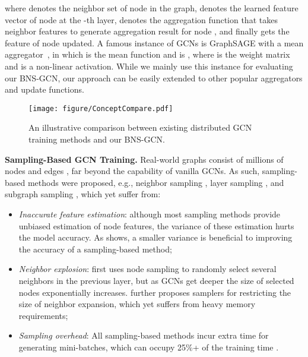 \documentclass{article}
\newcommand{\niparagraph}[1]{\noindent\textbf{#1}}
\begin{document}
where  denotes the neighbor set of node  in the graph,  denotes the learned feature vector of node  at the -th layer, 
 denotes the aggregation function that takes neighbor features to generate aggregation result  for node , and finally  gets the feature of node  updated. 
A famous instance of GCNs is GraphSAGE with a mean aggregator~\citep{hamilton2017inductive}, in which  is the mean function and  is , where  is the weight matrix and  is a non-linear activation. While we mainly use this instance for evaluating our BNS-GCN, our approach can be easily extended to other popular aggregators and update functions.
\begin{figure*}[!t]
    \begin{center}
    \texttt{[image: figure/ConceptCompare.pdf]}
    \end{center}
    \caption{An illustrative comparison between existing distributed GCN training methods and our BNS-GCN.}
    \label{fig:ConceptCompare}
\end{figure*}

\niparagraph{Sampling-Based GCN Training.}
Real-world graphs consist of millions of nodes and 
edges \citep{hu2020open}, far beyond the capability of vanilla GCNs. 
As such, sampling-based methods were proposed, e.g., neighbor sampling \citep{hamilton2017inductive,chen2018stochastic}, layer sampling \citep{chen2018fastgcn,huang2018adaptive,zou2019layer}, and subgraph sampling \citep{chiang2019cluster,zeng2019graphsaint}, which yet suffer from:
\begin{itemize}
\item \textit{Inaccurate feature estimation}: although most sampling methods provide unbiased estimation of node features, the variance of these estimation hurts the model accuracy. As \citep{cong2020minimal} shows, a smaller variance is beneficial to improving the accuracy of a sampling-based method;
\item \textit{Neighbor explosion}: \citet{hamilton2017inductive} first uses node sampling to randomly select several neighbors in the previous layer, but as GCNs get deeper the size of selected nodes exponentially increases. \citet{chen2018stochastic} further proposes samplers for restricting the size of neighbor expansion, which yet suffers from heavy memory requirements;
\item \textit{Sampling overhead}: All sampling-based methods incur extra time for generating mini-batches, which can occupy 25\%+ of the training time \citep{zeng2019graphsaint}.
\end{itemize}
\end{document}
